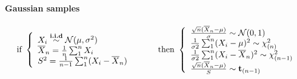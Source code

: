 \documentclass[a4paper,10pt]{article}
\begin{document}
\paragraph{Gaussian samples}
\[
\text{if }
\left\{
\begin{array}{l}
X_i \stackrel{\textbf{i.i.d}}{\sim} \mathcal{N}(\mu, \sigma^2) \\
\overline{X}_n = \frac{1}{n}\sum^n_1 X_i \\
S^2 = \frac{1}{n-1}\sum^n_1 (X_i - \overline{X}_n) 
\end{array}\right.
\hspace{10mm}
\text{then }
\left\{
\begin{array}{l}
\frac{\sqrt{n} (\overline{X}_n - \mu)}{\sigma} \sim \mathcal{N}(0,1) \\
\frac{1}{\sigma2}\sum^n_1 (X_i - \mu)^2 \sim \chi^2_{(n)} \\
\frac{1}{\sigma2}\sum^n_1 (X_i - \overline{X}_n)^2 \sim \chi^2_{(n-1)} \\
\frac{\sqrt{n} (\overline{X}_n - \mu)}{S} \sim \textbf{t}_{(n-1)}
\end{array}\right.
\]
\end{document}
